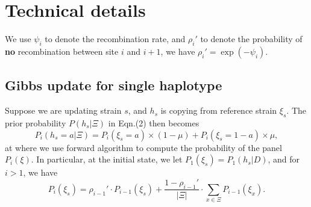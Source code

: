 


\section{Technical details} \label{sup:sec:alg}
We use $\psi_i$ to denote the recombination rate, and $\rho_i'$ to denote the probability of \textbf{no} recombination between site $i$ and $i+1$, we have $\rho_i' = \exp(-\psi_i)$.

\subsection{Gibbs update for single haplotype}
Suppose we are updating strain $s$, and $h_s$ is copying from reference strain $\xi_s$. The prior probability $P(h_s|\Xi)$ in Eqn.(2) then becomes
$$P_i(h_s = a|\Xi) = P_i(\xi_s = a) \times (1-\mu) + P_i(\xi_s = 1-a) \times \mu,$$
at where we use forward algorithm to compute the probability of the panel $P_i(\xi)$. In particular, at the initial state, we let $P_1(\xi_s) = P_1(h_s|D)$, and for $i>1$, we have
\begin{equation}
P_i(\xi_s) = \rho_{i-1}' \cdot P_{i-1}(\xi_s)  +  \frac{1-\rho_{i-1}'}{|\Xi|} \cdot \displaystyle\sum_{x\in \Xi} P_{i-1} (\xi_x ).\label{eqn:prior_gp}
\end{equation}

